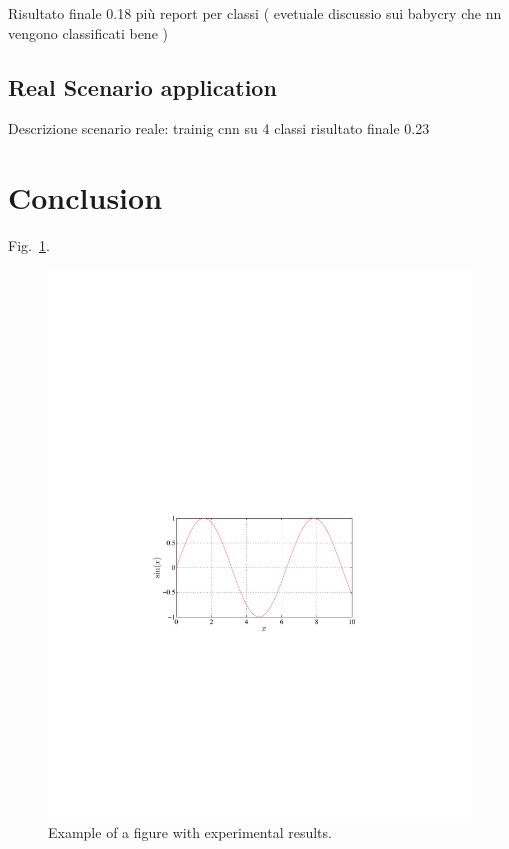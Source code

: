 \documentclass{article}
\begin{document}
\begin{sloppy}
Risultato finale 0.18 più report per classi ( evetuale discussio sui babycry che nn vengono classificati bene )
\label{sec:typestyle}

\subsection{Real Scenario application}
Descrizione scenario reale: trainig cnn su 4 classi
risultato finale 0.23

\section{Conclusion}
\label{sec:majhead}


Fig.~\ref{fig:results}. 

\begin{figure}[t]
  \centering
  \centerline{\includegraphics[width=\columnwidth]{fig1a}}
  \caption{Example of a figure with experimental results.}
  \label{fig:results}
\end{figure}


\end{sloppy}
\end{document}
